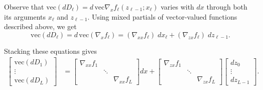 \documentclass{article}
\begin{document}
Observe that $\mathrm{vec}\left(dD_\ell\right) = d\,\mathrm{vec} \nabla_x
    f_\ell(z_{\ell-1}; x_\ell)$ varies with $dx$ through both its arguments
$x_\ell$ and $z_{\ell-1}$. Using mixed partials of vector-valued functions
described above, we get
\begin{equation}
    \mathrm{vec} \left(dD_\ell\right) = d\,\mathrm{vec}\left(\nabla_x f_\ell\right) = \left(\nabla_{xx} f_\ell\right)\; dx_\ell  + \left(\nabla_{zx} f_\ell\right)\; dz_{\ell-1}.
\end{equation}

Stacking these equations gives
\begin{align}
    \begin{bmatrix}
        \mathrm{vec}\left(dD_1\right) \\
        \vdots                        \\
        \mathrm{vec}\left(dD_L\right)
    \end{bmatrix}
     & =
    \begin{bmatrix}
        \nabla_{xx} f_1 &        &                 \\
                        & \ddots &                 \\
                        &        & \nabla_{xx} f_L
    \end{bmatrix}
    dx
    +
    \begin{bmatrix}
        \nabla_{zx} f_1 &        &                 \\
                        & \ddots &                 \\
                        &        & \nabla_{zx} f_L
    \end{bmatrix}
    \begin{bmatrix}
        dz_0 \\ \vdots \\ dz_{L-1}
    \end{bmatrix}
    .
\end{align}
\end{document}
